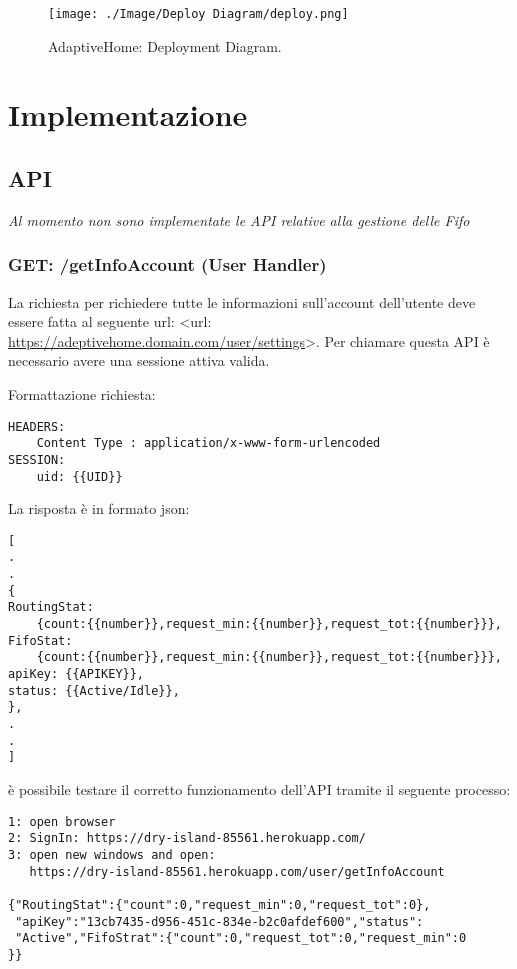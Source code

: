 \documentclass[onecolumn,a4paper]{article}
\begin{document}
\begin{figure}[htbp]
\centering
\texttt{[image: ./Image/Deploy Diagram/deploy.png]}
\caption{\label{fig:org54719f8}AdaptiveHome: Deployment Diagram.}
\end{figure}

\section{Implementazione}
\label{sec:org96a09fb}
\subsection{API}
\label{sec:org56c6c47}
\emph{Al momento non sono implementate le API relative alla gestione delle Fifo}

\subsubsection{GET: /getInfoAccount (User Handler)}
\label{sec:org095560a}

La richiesta per richiedere tutte le informazioni sull'account dell'utente deve essere fatta al seguente url: <url: \url{https://adeptivehome.domain.com/user/settings}>. Per chiamare questa API è necessario avere una sessione attiva valida. 

Formattazione richiesta:

\begin{verbatim}
HEADERS:
    Content Type : application/x-www-form-urlencoded
SESSION:
    uid: {{UID}}

\end{verbatim}

La risposta è in formato json: 

\begin{verbatim}
[
.
.
{
RoutingStat:
    {count:{{number}},request_min:{{number}},request_tot:{{number}}},
FifoStat:
    {count:{{number}},request_min:{{number}},request_tot:{{number}}},
apiKey: {{APIKEY}},
status: {{Active/Idle}},
},
.
.
]
\end{verbatim}

è possibile testare il corretto funzionamento dell'API tramite il seguente processo:

\begin{verbatim}
1: open browser
2: SignIn: https://dry-island-85561.herokuapp.com/
3: open new windows and open:
   https://dry-island-85561.herokuapp.com/user/getInfoAccount

{"RoutingStat":{"count":0,"request_min":0,"request_tot":0},
 "apiKey":"13cb7435-d956-451c-834e-b2c0afdef600","status":
 "Active","FifoStrat":{"count":0,"request_tot":0,"request_min":0
}}
\end{verbatim}
\end{document}
